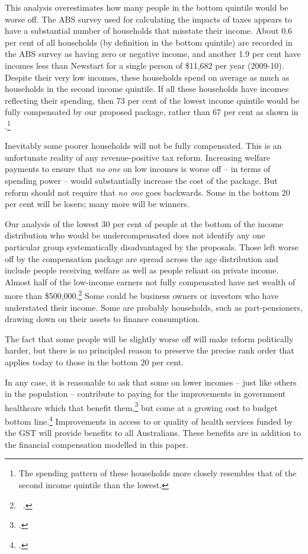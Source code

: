 This analysis overestimates how many people in the bottom quintile would be worse off. The ABS survey used for calculating the impacts of taxes appears to have a substantial number of households that misstate their income. About 0.6 per cent of all households (by definition in the bottom quintile) are recorded in the ABS survey as having zero or negative income, and another 1.9 per cent have incomes less than Newstart for a single person of \$11,682 per year (2009-10). Despite their very low incomes, these households spend on average as much as households in the second income quintile. If all these households have incomes reflecting their spending, then 73 per cent of the lowest income quintile would be fully compensated by our proposed package, rather than 67 per cent as shown in .\footnote{The spending pattern of these households more closely resembles that of the second income quintile than the lowest.}

Inevitably some poorer households will not be fully compensated. This is an unfortunate reality of any revenue-positive tax reform. Increasing welfare payments to ensure that \emph{no one} on low incomes is worse off – in terms of spending power – would substantially increase the cost of the package. But reform should not require that \emph{no one} goes backwards. Some in the bottom 20 per cent will be losers; many more will be winners. 

Our analysis of the lowest 30 per cent of people at the bottom of the income distribution who would be undercompensated does not identify any one particular group systematically disadvantaged by the proposals. Those left worse off by the compensation package are spread across the age distribution and include people receiving welfare as well as people reliant on private income. Almost half of the low-income earners not fully compensated have net wealth of more than \$500,000.\footnote{\gao\ \textcite{ABS2013-HES-2011-12-CURF}.}  Some could be business owners or investors who have understated their income. Some are probably households, such as part-pensioners, drawing down on their assets to finance consumption. 

The fact that some people will be slightly worse off will make reform politically harder, but there is no principled reason to preserve the precise rank order that applies today to those in the bottom 20 per cent.

In any case, it is reasonable to ask that some on lower incomes – just like others in the population – contribute to paying for the improvements in government healthcare which that benefit them,\footcite[][14]{Deloitte2015TaxReformSheddingLight}  but come at a growing cost to budget bottom line.\footcite[][20]{DaleyWoodWeidmannEtAl2014}  Improvements in access to or quality of health services funded by the GST will provide benefits to all Australians. These benefits are in addition to the financial compensation modelled in this paper.

